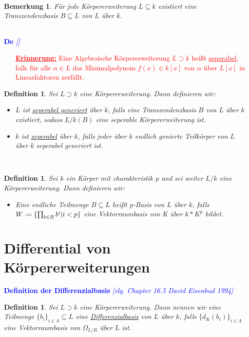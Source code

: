 \documentclass[10pt,a4paper]{report}
\newcommand{\comment}[1]{}
\newcommand{\ModulsOfDifferenzials}{David Eisenbud 1994}
\newcounter{Aussage}[chapter]
\newtheorem{bem}[Aussage]{Bemerkung}
\newtheorem{definition}[Aussage]{Definition}
\newcommand{\divR}[2]{\Omega_{#1/#2}}
\newcommand{\divf}[1]{d_{#1}}
\newcommand*{\defeq}{\mathrel{\vcenter{\baselineskip0.5ex \lineskiplimit0pt
                     \hbox{\scriptsize.}\hbox{\scriptsize.}}}%
                     =}
\begin{document}
\ \\
\begin{bem}
Für jede Körpererweiterung $L \subseteq k$ existiert eine Transzendenzbasis $B \subseteq L$ von $L$ über k.
\end{bem}


\ \\
\textcolor{blue}{\textbf{De} \textit{[]}}
\textcolor{red}{
\begin{itemize}
\item[\underline{\textbf{Erinnerung:}}] Eine Algebraische Körpererweiterung $L \supset k$ heißt \underline{seperabel}, falls für alle $\alpha \in L$ das Minimalpolynom $f(x) \in k[x]$ von $\alpha$ über $L[x]$ in Linearfaktoren zerfällt.
\end{itemize}
}
\begin{definition}\label{Definition Seperabel}
Sei $L \supset k$ eine Körpererweiterung. Dann definieren wir:
\begin{itemize}
\item $L$ ist \underline{seperabel generiert} über $k$, falls eine Transzendenzbasis $B$ von $L$ über $k$ existiert, sodass $L/k(B)$ eine seperable Körpererweiterung ist.
\item $k$ ist \underline{seperabel} über $k$, falls jeder über $k$ endlich genierte Teilkörper von $L$ über $k$ seperabel generiert ist.
\end{itemize}
\end{definition}


\ \\
\begin{definition}
Sei $k$ ein Körper mit charakteristik p und sei weiter $L/k$ eine Körpererweiterung. Dann definieren wir:
\begin{itemize}
\item Eine endliche Teilmenge $B \subseteq L$ heißt p-Basis von $L$ über $k$, falls $W \defeq \lbrace \prod_{b \in B} b^i \vert i < p \rbrace$ eine Vektorraumbasis von K über $k * K^p$ bildet.
\end{itemize}
\end{definition}

\section{Differential von Körpererweiterungen}

\textcolor{blue}{\textbf{Definition der Differenzialbasis} \textit{[vlg. Chapter 16.5 \ModulsOfDifferenzials]}}
\begin{definition}\comment{\label{Definition der Differenzialbasis}}
Sei $L \supset k$ eine Körpererweiterung. Dann nennen wir eine Teilmenge $\lbrace b_i \rbrace_{i \in \Lambda} \subseteq L$ eine \underline{Differenzialbasis} von $L$ über $k$, falls $\lbrace \divf{K}(b_i)\rbrace_{i \in \Lambda}$ eine Vektorraumbasis von $\divR{L}{R}$ über $L$ ist.
\end{definition}
\end{document}
